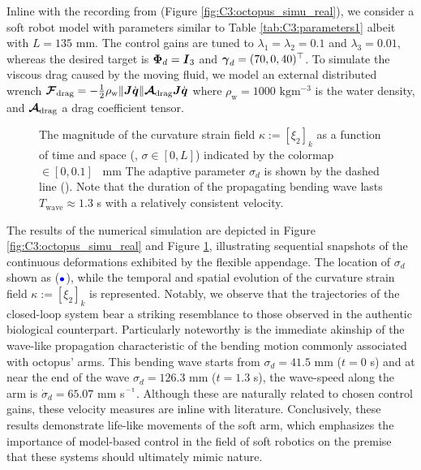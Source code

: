 Inline with the recording from \cite{Sumbre2001Sep} (Figure \ref{fig:C3:octopus_simu_real}), we consider a soft robot model with parameters similar to Table \ref{tab:C3:parameters1} albeit with $L = 135$ \si{\milli \meter}. The control gains are tuned to $\lambda_1 = \lambda_2 = 0.1$ and $\lambda_3 = 0.01$, whereas the desired target is ${\boldsymbol{\Phi}}_d = {\boldsymbol{I}}_3$ and ${\boldsymbol{\gamma}}_d = (70, 0, 40)^\top$. To simulate the viscous drag caused by the moving fluid, we model an external distributed wrench $\boldsymbol{\mathcal{F}}_{\textrm{drag}} = -\frac{1}{2}\rho_{\textrm{w}} \lVert{\boldsymbol{J}} {\dot{\boldsymbol{q}}}\rVert \boldsymbol{\mathcal{A}}_{\textrm{drag}} {\boldsymbol{J}} {\dot{\boldsymbol{q}}} $ where $\rho_{\textrm{w}} = 1000$ $\text{kg}\text{m}^{-3}$ is the water density, and $\boldsymbol{\mathcal{A}}_{\textrm{drag}}$ a drag coefficient tensor. %
\vspace{1mm}
\begin{figure}[!t]
  \centering
  \vspace{-2mm}
  
  \vspace{-7mm}
  \caption{\small The magnitude of the curvature strain field $\kappa:=[\xi_2]_k$ as a function of time and space (\ie, $\sigma \in [0,L]$) indicated by the colormap \protect{}$\!\!\in [0,0.1]$ \si{\per \milli \meter } The adaptive parameter $\sigma_d$ is shown by the dashed line (). Note that the duration of the propagating bending wave lasts $T_{\textrm{wave}} \approx 1.3$ s with a relatively consistent velocity. }\label{fig:C3:bend_propogate}
  \vspace{-4mm}
\end{figure}
The results of the numerical simulation are depicted in Figure \ref{fig:C3:octopus_simu_real} and Figure \ref{fig:C3:bend_propogate}, illustrating sequential snapshots of the continuous deformations exhibited by the flexible appendage. The location of $\sigma_d$ shown as ($\textcolor{blue}{\bullet}$), while the temporal and spatial evolution of the curvature strain field $\kappa:=[\xi_2]_k$ is represented. Notably, we observe that the trajectories of the closed-loop system bear a striking resemblance to those observed in the authentic biological counterpart. Particularly noteworthy is the immediate akinship of the wave-like propagation characteristic of the bending motion commonly associated with octopus' arms. This bending wave starts from $\sigma_d = 41.5$ mm ($t=0$ s) and at near the end of the wave $\sigma_d = 126.3$ mm ($t=1.3$ s), the wave-speed along the arm is $\dot{\sigma}_d = 65.07$ mm s$\inv$. Although these are naturally related to chosen control gains, these velocity measures are inline with literature. Conclusively, these results demonstrate life-like movements of the soft arm, which emphasizes the importance of model-based control in the field of soft robotics on the premise that these systems should ultimately mimic nature.
